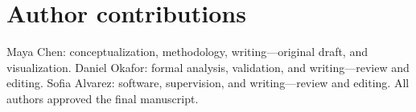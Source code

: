 \section*{Author contributions}

Maya Chen: conceptualization, methodology, writing---original draft, and
visualization. Daniel Okafor: formal analysis, validation, and writing---review
and editing. Sofia Alvarez: software, supervision, and writing---review and
editing. All authors approved the final manuscript.
